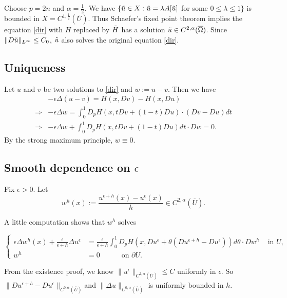 \documentclass[11pt,reqno]{amsart}
\numberwithin{figure}{section}
\theoremstyle{plain}
\theoremstyle{remark}
\numberwithin{equation}{section}
\begin{document}
\begin{appendices}
Choose $p=2n$ and $\displaystyle \alpha =\frac{1}{2}$. We have $\{\Tilde{u}\in X : \Tilde{u}=\lambda A[\Tilde{u}]$ for some $0 \leq  \lambda \leq 1\}$ is bounded in $X= C^{1, \frac{1}{2}}(
\overline{U})$.
Thus Schaefer's fixed point theorem implies the equation \eqref{dir} with $H$ replaced by $\Tilde{H}$ has a solution $\Tilde{u} \in C^{2,\alpha} (\overline{\Omega})$. Since $\| D\Tilde{u}\|_{L^\infty} \leq C_0$, $\Tilde{u}$ also solves the original equation \eqref{dir}.



\subsection{Uniqueness}
Let $u$ and $v$ be two solutions to \eqref{dir} and $w := u-v$. Then we have
\begin{equation}
\begin{aligned}
    &-\epsilon \Delta (u-v) = H(x, Dv)-H(x, Du)\\
    \Rightarrow &-\epsilon \Delta w   =\int_0^1 D_pH(x, tDv+(1-t)Du) \cdot (Dv-Du)dt\\
    \Rightarrow &-\epsilon \Delta w  +\int_0^1 D_pH(x, tDv+(1-t)Du)dt \cdot Dw = 0.
\end{aligned}
\end{equation}
By the strong maximum principle, $w \equiv 0$.



\subsection{Smooth dependence on $\epsilon$}
Fix $\epsilon >0$. Let  $$w^h(x):=\frac{u^{\epsilon+h}(x)-u^\epsilon(x)}{h} \in C^{2,\alpha}(\overline{U}).$$

A little computation shows that $w^h$ solves

\begin{equation}
\label{dir_quo}
\left\{
  \begin{aligned}
   \epsilon \Delta w^h(x) + \frac{\epsilon}{\epsilon + h}\Delta u^\epsilon &= \frac{\epsilon}{\epsilon +h} \int_0^1 D_pH(x, Du^\epsilon+\theta (Du^{\epsilon+h}-Du^\epsilon)) d\theta \cdot Dw^h \quad \, \text{in } U, \\
              w^h &= 0 \quad \qquad \text{on } \partial U.
  \end{aligned}
\right.
\end{equation}

From the existence proof, we know $\|u^\epsilon\|_{C^{2,\alpha}(\overline{U})} \leq C$ uniformly in $\epsilon$. So $\|Du^{\epsilon+h}-Du^\epsilon\|_{C^{0,\alpha}(\overline{U})}$and $\|\Delta u\|_{C^{0,\alpha}(\overline{U})}
$ is uniformly bounded in $h$.  


\end{appendices}
\end{document}
